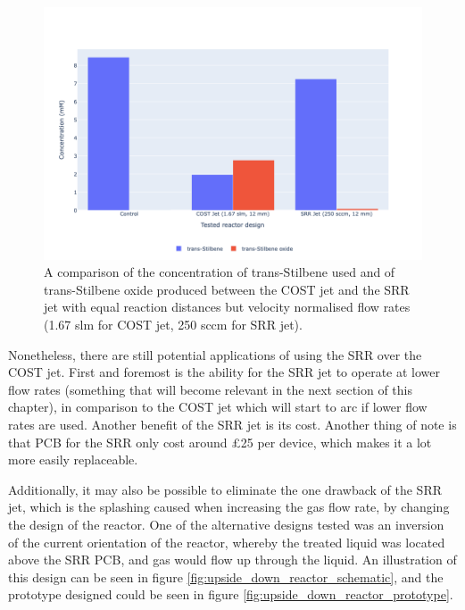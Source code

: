 \begin{figure}[h!]
	\centering
    \includegraphics[width=\linewidth]{chapter_6/figures/cost_jet_vs_srr_jet_1670sccm_test.png} 
	\caption{A comparison of the concentration of trans-Stilbene used and of trans-Stilbene oxide produced between the COST jet and the SRR jet with equal reaction distances but velocity normalised flow rates (1.67 slm for COST jet, 250 sccm for SRR jet).}
	\label{fig:cost_jet_vs_srr_jet_1670sccm_test}
\end{figure} 

  Nonetheless, there are still potential applications of using the SRR over the COST jet. First and foremost is the ability for the SRR jet to operate at lower flow rates (something that will become relevant in the next section of this chapter), in comparison to the COST jet which will start to arc if lower flow rates are used. Another benefit of the SRR jet is its cost. Another thing of note is that  PCB for the SRR only cost around £25 per device, which makes it a lot more easily replaceable. 

Additionally, it may also be possible to eliminate the one drawback of the SRR jet, which is the splashing caused when increasing the gas flow rate, by changing the design of the reactor. One of the alternative designs tested was an inversion of the current orientation of the reactor, whereby the treated liquid was located above the SRR PCB, and gas would flow up through the liquid. An illustration of this design can be seen in figure \ref{fig:upside_down_reactor_schematic}, and the prototype designed could be seen in figure \ref{fig:upside_down_reactor_prototype}. 

